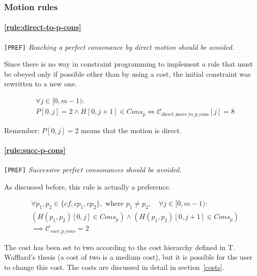 \subsubsection{Motion rules}
\paragraph{\hspace{.6cm}\ref{rule:direct-to-p-cons}} \greendots \texttt{[PREF]} \textit{Reaching a perfect consonance by direct motion should be avoided.}

    Since there is no way in constraint programming to implement a rule that must be obeyed only if possible other than by using a cost, the initial constraint was rewritten to a new one.

    \begin{equation} \begin{aligned}
    &\forall j \in [0, m-1) :\\
    &P[0, j] = 2 \land H[0, j+1] \in Cons_{p} \iff \mathcal{C}_{\text{{direct\_move\_to\_p\_cons}}}[j] = 8
    \end{aligned} \end{equation}

    Remember: $P[0,j] = 2$ means that the motion is direct.
    
\paragraph{\hspace{.6cm}\ref{rule:succ-p-cons}} \texttt{[PREF]} \textit{Successive perfect consonances should be avoided.}

    As discussed before, this rule is actually a preference.

    \begin{equation} \begin{aligned}
    &\forall p_1, p_2 \in \{\mathit{cf}, cp_1, cp_2\}, \text{ where } p_1 \neq p_2, \quad \forall j \in [0, m-1) \colon\\
    &(H(p_1,p_2)[0, j] \in Cons_p) \land (H(p_1,p_2)[0, j+1] \in Cons_p)\\
    &\implies \mathcal{C}_{succ\_p\_cons} = 2
    \end{aligned} \end{equation}

    The cost has been set to two according to the cost hierarchy defined in T. Wafflard's thesis (a cost of two is a medium cost), but it is possible for the user to change this cost. The costs are discussed in detail in section~\ref{costs}.
    
